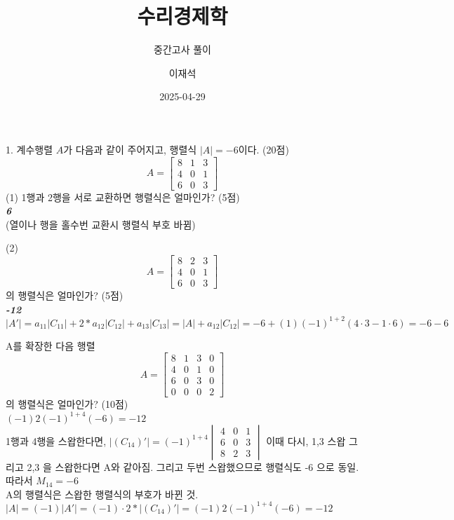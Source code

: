 \documentclass[aspectratio=169]{beamer}
\title{수리경제학}
\subtitle{중간고사 풀이}
\author{이재석}
\date{2025-04-29}
\begin{document}
\begin{frame}
  \titlepage
\end{frame}



\begin{frame}
  1. 계수행렬 \( A \)가 다음과 같이 주어지고, 행렬식 \( |A| = -6 \)이다. (20점)
  \[
    A = \begin{bmatrix}
    8 & 1 & 3 \\
    4 & 0 & 1 \\
    6 & 0 & 3
    \end{bmatrix}
  \]
  (1) 1행과 2행을 서로 교환하면 행렬식은 얼마인가? (5점) \\
  \hspace{30pt} \textbf{\emph{6}} \\
  (열이나 행을 홀수번 교환시 행렬식 부호 바뀜) \\
\end{frame}


\begin{frame}
  (2) 
  \[
    A = \begin{bmatrix}
    8 & 2 & 3 \\
    4 & 0 & 1 \\
    6 & 0 & 3
    \end{bmatrix}
  \]
  의 행렬식은 얼마인가? (5점) \\
  \hspace{30pt} \textbf{\emph{-12 }} \\
  $|A'| = a_{11} |C_{11}| + 2 * a_{12} |C_{12}| + a_{13} |C_{13}| = |A| + a_{12} |C_{12}| = -6 + (1)(-1)^{1+2} (4\cdot 3 - 1 \cdot 6) = -6 -6$ 

\end{frame}



\begin{frame}
  A를 확장한 다음 행렬
  \[
    A = \begin{bmatrix}
    8 & 1 & 3 & 0 \\
    4 & 0 & 1 & 0 \\
    6 & 0 & 3 & 0 \\
    0 & 0 & 0 & 2
    \end{bmatrix}
  \]
  의 행렬식은 얼마인가? (10점) \\
  \hspace{30pt} \textbf{\emph{ $(-1) 2 (-1)^{1+4} (-6) = -12$  }} \\

  1행과 4행을 스왑한다면, $|(C_{14})'| = (-1)^{1+4} \begin{vmatrix}
    4 & 0 & 1 \\
    6 & 0 & 3 \\
    8 & 2 & 3 
    \end{vmatrix}$
    이때 다시, 1,3 스왑 그리고 2,3 을 스왑한다면 A와 같아짐. 그리고 두번 스왑했으므로 행렬식도 -6 으로 동일. 따라서 $M_{14} = -6$ \\
    A의 행렬식은 스왑한 행렬식의 부호가 바뀐 것. \\
    $|A| = (-1) |A'| = (-1) \cdot 2 * |(C_{14})'| = (-1) 2 (-1)^{1+4} (-6) = -12$


\end{frame}
\end{document}
